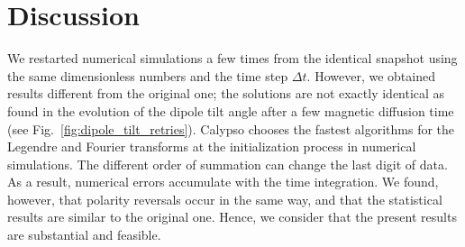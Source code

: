 \section{Discussion}
\label{section:discussion}

We restarted numerical simulations a few times from the identical snapshot using the same dimensionless numbers and the time step $\Delta t$.
However, we obtained results different from the original one; the solutions are not exactly identical
as found in the evolution of the dipole tilt angle after a few magnetic diffusion time (see Fig.~\ref{fig:dipole_tilt_retries}). 
Calypso chooses the fastest algorithms for the Legendre and Fourier transforms at the initialization process in numerical simulations. 
The different order of summation can change the last digit of data. 
As a result, numerical errors accumulate with the time integration. 
{\color{red}
We found, however, that polarity reversals occur in the same way, and that the statistical results are similar to the original one.
Hence, we consider that the present results are substantial and feasible.
}

